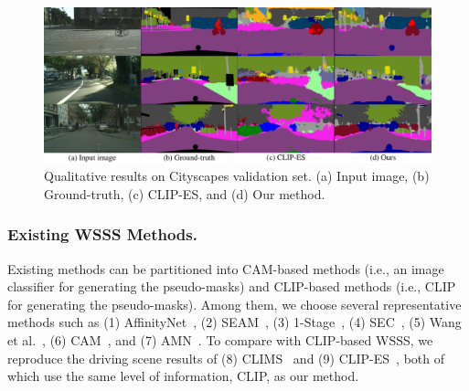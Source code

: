 \documentclass[letterpaper]{article} %
\def\ie{i.e.} \def\Ie{I.e.}
\begin{document}
\begin{figure}[t!]
\centering
\includegraphics[width=16cm]{figures/fig_qualitative_city.pdf}
\caption{Qualitative results on Cityscapes validation set. (a) Input image, (b) Ground-truth, (c) CLIP-ES, and (d) Our method.}
\label{fig:qualitative_city}
\end{figure}

\subsubsection{Existing WSSS Methods.} Existing methods can be partitioned into CAM-based methods (\ie, an image classifier for generating the pseudo-masks) and CLIP-based methods (\ie, CLIP for generating the pseudo-masks). Among them, we choose several representative methods such as (1) AffinityNet~\cite{ahn2018learning}, (2) SEAM~\cite{wang2020self}, (3) 1-Stage~\cite{araslanov2020single}, (4) SEC~\cite{kolesnikov2016seed}, (5) Wang et al.~\cite{wang2020deep}, (6) CAM~\cite{zhou2016learning}, and  (7) AMN~\cite{lee2022threshold}. To compare with CLIP-based WSSS, we reproduce the driving scene results of (8) CLIMS~\cite{Xie_2022_CVPR} and (9) CLIP-ES~\cite{Lin_2023_CVPR}, both of which use the same level of information, CLIP, as our method.
\end{document}
